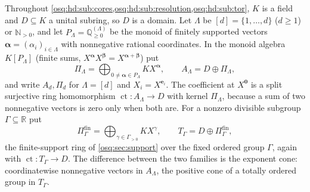 \documentclass[11pt,letterpaper]{article}
\numberwithin{equation}{section}
\theoremstyle{definition}
\theoremstyle{remark}
\theoremstyle{plain}
\newcommand{\Q}{\mathbb Q}
\newcommand{\R}{\mathbb R}
\newcommand{\N}{\mathbb N}
\newcommand{\ct}{\operatorname{ct}}
\begin{document}
Throughout \cref{osq:hd:sub:cores,osq:hd:sub:resolution,osq:hd:sub:tor}, $K$ is a field and $D\subseteq K$ a unital
subring, so $D$ is a domain. Let $\Lambda$ be $[d]=\{1,\dots,d\}$ ($d\ge1$) or $\N_{>0}$, and let
$P_\Lambda=\Q_{\ge0}^{(\Lambda)}$ be the monoid of finitely supported vectors
$\boldsymbol\alpha=(\alpha_i)_{i\in\Lambda}$ with nonnegative rational coordinates. In the monoid algebra
$K[P_\Lambda]$ (finite sums, $X^{\boldsymbol\alpha}X^{\boldsymbol\beta}=X^{\boldsymbol\alpha+\boldsymbol\beta}$) put
\begin{equation}\label{osq:hd:eq:cores}
 \Pi_\Lambda=\bigoplus_{0\ne\boldsymbol\alpha\in P_\Lambda}KX^{\boldsymbol\alpha},\qquad
 A_\Lambda=D\oplus\Pi_\Lambda ,
\end{equation}
and write $A_d,\Pi_d$ for $\Lambda=[d]$ and $X_i=X^{\mathbf e_i}$. The coefficient at $X^{\mathbf 0}$ is a split
surjective ring homomorphism $\ct:A_\Lambda\to D$ with kernel $\Pi_\Lambda$, because a sum of two nonnegative
vectors is zero only when both are. For a nonzero divisible subgroup $\Gamma\subseteq\R$ put
\begin{equation}\label{osq:hd:eq:T}
 \Pi^{\mathrm{fin}}_\Gamma=\bigoplus_{\gamma\in\Gamma_{>0}}KX^\gamma,\qquad
 T_\Gamma=D\oplus\Pi^{\mathrm{fin}}_\Gamma ,
\end{equation}
the finite-support ring of \cref{osq:sec:support} over the fixed ordered group $\Gamma$, again with
$\ct:T_\Gamma\to D$. The difference between the two families is the exponent cone: coordinatewise
nonnegative vectors in $A_\Lambda$, the positive cone of a totally ordered group in $T_\Gamma$.
\end{document}

